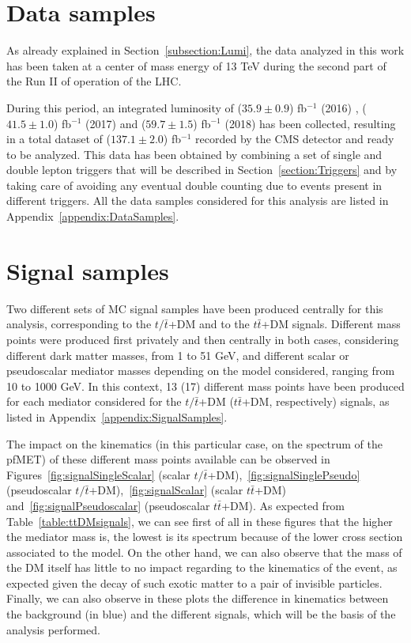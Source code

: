 \documentclass[a4paper, 10pt, openright]{report}
\begin{document}
\section{Data samples} \label{section:Data}

As already explained in Section~\ref{subsection:Lumi}, the data analyzed in this work has been taken at a center of mass energy of 13 TeV during the second part of the Run II of operation of the \ac{LHC}. 

During this period, an integrated luminosity of ($35.9 \pm 0.9$) fb$^{-1}$ (2016) \cite{Lumi2016}, ($41.5 \pm 1.0$) fb$^{-1}$ (2017) \cite{Lumi2017} and ($59.7 \pm 1.5$) fb$^{-1}$ (2018) \cite{Lumi2018} has been collected, resulting in a total dataset of ($137.1 \pm 2.0$) fb$^{-1}$ recorded by the \ac{CMS} detector and ready to be analyzed. This data has been obtained by combining a set of single and double lepton triggers that will be described in Section~\ref{section:Triggers} and by taking care of avoiding any eventual double counting due to events present in different triggers. All the data samples considered for this analysis are listed in Appendix~\ref{appendix:DataSamples}.

\section{Signal samples} \label{section:Signals}

Two different sets of \ac{MC} signal samples have been produced centrally for this analysis, corresponding to the $t/\bar t$+DM and to the $t \bar t$+DM signals. Different mass points were produced first privately and then centrally in both cases, considering different dark matter masses, from 1 to 51 GeV, and different scalar or pseudoscalar mediator masses depending on the model considered, ranging from 10 to 1000 GeV. In this context, 13 (17) different mass points have been produced for each mediator considered for the $t/\bar t$+DM ($t \bar t$+DM, respectively) signals, as listed in Appendix~\ref{appendix:SignalSamples}.

The impact on the kinematics (in this particular case, on the spectrum of the pf\ac{MET}) of these different mass points available can be observed in Figures~\ref{fig:signalSingleScalar} (scalar $t/\bar t$+DM),~\ref{fig:signalSinglePseudo} (pseudoscalar $t/\bar t$+DM),~\ref{fig:signalScalar} (scalar $t \bar t$+DM) and~\ref{fig:signalPseudoscalar} (pseudoscalar $t \bar t$+DM). As expected from Table~\ref{table:ttDMsignals}, we can see first of all in these figures that the higher the mediator mass is, the lowest is its spectrum because of the lower cross section associated to the model. On the other hand, we can also observe that the mass of the \ac{DM} itself has little to no impact regarding to the kinematics of the event, as expected given the decay of such exotic matter to a pair of invisible particles. Finally, we can also observe in these plots the difference in kinematics between the background (in blue) and the different signals, which will be the basis of the analysis performed.
\end{document}
